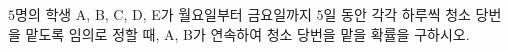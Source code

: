 $5$명의 학생 A, B, C, D, E가 월요일부터 금요일까지 $5$일 동안 각각 하루씩 청소 당번을 맡도록 임의로 정할 때, A, B가 연속하여 청소 당번을 맡을 확률을 구하시오.
